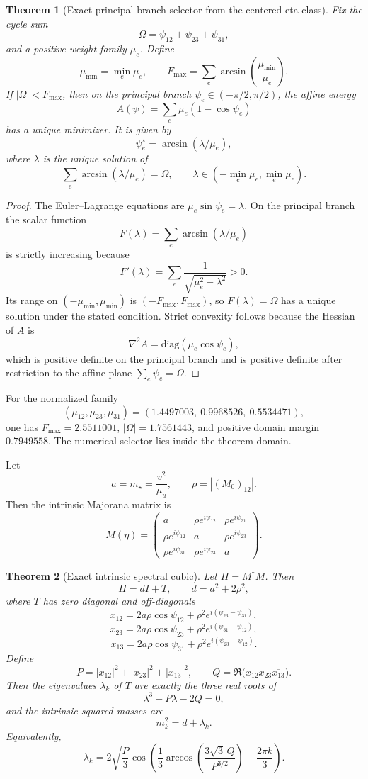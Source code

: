\documentclass[11pt]{article}
\newtheorem{theorem}{Theorem}[section]
\begin{document}
\begin{theorem}[Exact principal-branch selector from the centered eta-class]
Fix the cycle sum
\[
\Omega=\psi_{12}+\psi_{23}+\psi_{31},
\]
and a positive weight family \(\mu_e\). Define
\[
\mu_{\min}=\min_e\mu_e,
\qquad
F_{\max}=\sum_e\arcsin\!\left(\frac{\mu_{\min}}{\mu_e}\right).
\]
If \(|\Omega|<F_{\max}\), then on the principal branch
\(\psi_e\in(-\pi/2,\pi/2)\), the affine energy
\[
A(\psi)=\sum_e \mu_e(1-\cos\psi_e)
\]
has a unique minimizer. It is given by
\[
\psi_e^\star=\arcsin(\lambda/\mu_e),
\]
where \(\lambda\) is the unique solution of
\[
\sum_e \arcsin(\lambda/\mu_e)=\Omega,
\qquad
\lambda\in(-\min_e\mu_e,\min_e\mu_e).
\]
\end{theorem}

\begin{proof}
The Euler--Lagrange equations are \(\mu_e\sin\psi_e=\lambda\). On the principal branch the scalar
function
\[
F(\lambda)=\sum_e\arcsin(\lambda/\mu_e)
\]
is strictly increasing because
\[
F'(\lambda)=\sum_e\frac{1}{\sqrt{\mu_e^2-\lambda^2}}>0.
\]
Its range on \((-\mu_{\min},\mu_{\min})\) is \((-F_{\max},F_{\max})\), so
\(F(\lambda)=\Omega\) has a unique solution under the stated condition. Strict
convexity follows because the Hessian of \(A\) is
\[
\nabla^2A=\mathrm{diag}(\mu_e\cos\psi_e),
\]
which is positive definite on the principal branch and is positive definite after
restriction to the affine plane \(\sum_e\psi_e=\Omega\).
\end{proof}

For the normalized family
\[
(\mu_{12},\mu_{23},\mu_{31})=(1.4497003,\ 0.9968526,\ 0.5534471),
\]
one has \(F_{\max}=2.5511001\), \(|\Omega|=1.7561443\), and positive domain margin
\(0.7949558\). The numerical selector lies inside the theorem domain.

Let
\[
a=m_\star=\frac{v^2}{\mu_u},
\qquad
\rho = |(M_0)_{12}|.
\]
Then the intrinsic Majorana matrix is
\[
M(\eta)=
\begin{pmatrix}
a & \rho e^{i\psi_{12}} & \rho e^{i\psi_{31}}\\
\rho e^{i\psi_{12}} & a & \rho e^{i\psi_{23}}\\
\rho e^{i\psi_{31}} & \rho e^{i\psi_{23}} & a
\end{pmatrix}.
\]

\begin{theorem}[Exact intrinsic spectral cubic]
Let \(H=M^\dagger M\). Then
\[
H=dI+T,
\qquad
d=a^2+2\rho^2,
\]
where \(T\) has zero diagonal and off-diagonals
\[
x_{12}=2a\rho\cos\psi_{12}+\rho^2e^{i(\psi_{23}-\psi_{31})},
\]
\[
x_{23}=2a\rho\cos\psi_{23}+\rho^2e^{i(\psi_{31}-\psi_{12})},
\]
\[
x_{13}=2a\rho\cos\psi_{31}+\rho^2e^{i(\psi_{23}-\psi_{12})}.
\]
Define
\[
P=|x_{12}|^2+|x_{23}|^2+|x_{13}|^2,
\qquad
Q=\Re\!\bigl(x_{12}x_{23}\overline{x_{13}}\bigr).
\]
Then the eigenvalues \(\lambda_k\) of \(T\) are exactly the three real roots of
\[
\lambda^3-P\lambda-2Q=0,
\]
and the intrinsic squared masses are
\[
m_k^2=d+\lambda_k.
\]
Equivalently,
\[
\lambda_k=
2\sqrt{\frac{P}{3}}
\cos\!\left(
\frac13\arccos\!\left(\frac{3\sqrt3\,Q}{P^{3/2}}\right)-\frac{2\pi k}{3}
\right).
\]
\end{theorem}
\end{document}
